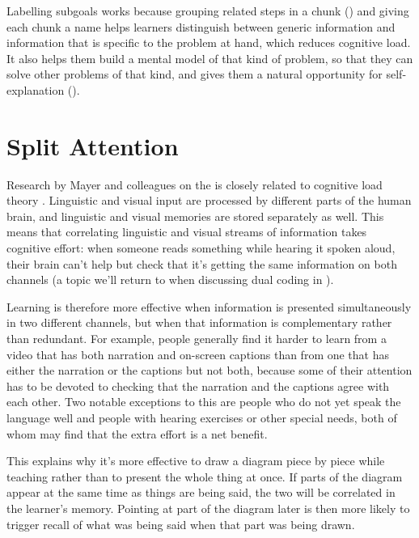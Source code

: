 Labelling subgoals works because grouping related steps in a chunk
() and giving each chunk a name helps
learners distinguish between generic information and information that
is specific to the problem at hand, which reduces cognitive load.  It
also helps them build a mental model of that kind of problem, so that
they can solve other problems of that kind, and gives them a natural
opportunity for self-explanation ().

\section{Split Attention}\label{s:load-split-attention}

Research by Mayer and colleagues on the
 is closely
related to cognitive load theory \cite{Maye2003}.  Linguistic and
visual input are processed by different parts of the human brain, and
linguistic and visual memories are stored separately as well. This
means that correlating linguistic and visual streams of information
takes cognitive effort: when someone reads something while hearing it
spoken aloud, their brain can't help but check that it's getting the
same information on both channels (a topic we'll return to when
discussing dual coding in ).

Learning is therefore more effective when information is presented
simultaneously in two different channels, but when that information is
complementary rather than redundant. For example, people generally
find it harder to learn from a video that has both narration and
on-screen captions than from one that has either the narration or the
captions but not both, because some of their attention has to be
devoted to checking that the narration and the captions agree with
each other.  Two notable exceptions to this are people who do not yet
speak the language well and people with hearing exercises or other
special needs, both of whom may find that the extra effort is a net
benefit.

This explains why it's more effective to draw a diagram piece by piece
while teaching rather than to present the whole thing at once. If
parts of the diagram appear at the same time as things are being said,
the two will be correlated in the learner's memory. Pointing at part
of the diagram later is then more likely to trigger recall of what was
being said when that part was being drawn.

